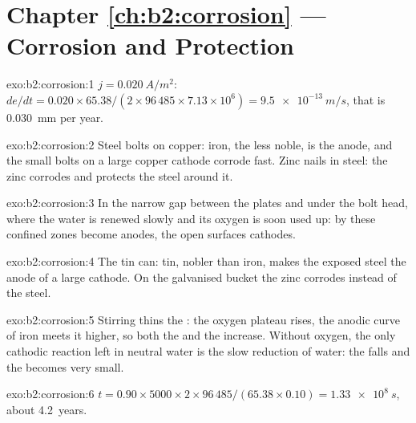 \section*{Chapter \ref{ch:b2:corrosion} --- Corrosion and Protection}

\begin{solution}{exo:b2:corrosion:1}
$j = \qty{0.020}{A/m^2}$: $de/dt = 0.020 \times 65.38/(2 \times 96\,485 \times 7.13
\times 10^6) = \qty{9.5e-13}{m/s}$, that is \qty{0.030}{mm} per year.
\end{solution}

\begin{solution}{exo:b2:corrosion:2}
Steel bolts on copper: iron, the less noble, is the anode, and the small bolts
on a large copper cathode corrode fast. Zinc nails in steel: the zinc corrodes
and protects the steel around it.
\end{solution}

\begin{solution}{exo:b2:corrosion:3}
In the narrow gap between the plates and under the bolt head, where the water
is renewed slowly and its oxygen is soon used up: by 
these confined zones become anodes, the open surfaces cathodes.
\end{solution}

\begin{solution}{exo:b2:corrosion:4}
The tin can: tin, nobler than iron, makes the exposed steel the anode of a
large cathode. On the galvanised bucket the zinc corrodes instead of the
steel.
\end{solution}

\begin{solution}{exo:b2:corrosion:5}
Stirring thins the : the oxygen plateau rises, the anodic curve
of iron meets it higher, so both the  and the  increase. Without oxygen, the only cathodic reaction left in neutral
water is the slow reduction of water: the  falls and the
 becomes very small.
\end{solution}

\begin{solution}{exo:b2:corrosion:6}
$t = 0.90 \times 5000 \times 2 \times 96\,485/(65.38 \times 0.10) = \qty{1.33e8}{s}$,
about 4.2~years.
\end{solution}

